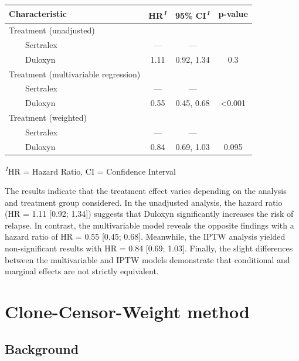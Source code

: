 \documentclass[
]{book}
\begin{document}
\begin{table}[!t]
\fontsize{12.0pt}{14.4pt}\selectfont
\begin{tabular*}{\linewidth}{@{\extracolsep{\fill}}lccc}
\toprule
\textbf{Characteristic} & \textbf{HR}\textsuperscript{\textit{1}} & \textbf{95\% CI}\textsuperscript{\textit{1}} & \textbf{p-value} \\ 
\midrule\addlinespace[2.5pt]
Treatment (unadjusted) &  &  &  \\ 
    Sertralex & — & — &  \\ 
    Duloxyn & 1.11 & 0.92, 1.34 & 0.3 \\ 
Treatment (multivariable regression) &  &  &  \\ 
    Sertralex & — & — &  \\ 
    Duloxyn & 0.55 & 0.45, 0.68 & <0.001 \\ 
Treatment (weighted) &  &  &  \\ 
    Sertralex & — & — &  \\ 
    Duloxyn & 0.84 & 0.69, 1.03 & 0.095 \\ 
\bottomrule
\end{tabular*}
\begin{minipage}{\linewidth}
\textsuperscript{\textit{1}}HR = Hazard Ratio, CI = Confidence Interval\\
\end{minipage}
\end{table}

The results indicate that the treatment effect varies depending on the
analysis and treatment group considered. In the unadjusted analysis, the
hazard ratio (HR = 1.11 {[}0.92; 1.34{]}) suggests that Duloxyn
significantly increases the risk of relapse. In contrast, the
multivariable model reveals the opposite findings with a hazard ratio of
HR = 0.55 {[}0.45; 0.68{]}. Meanwhile, the IPTW analysis yielded
non-significant results with HR = 0.84 {[}0.69; 1.03{]}. Finally, the
slight differences between the multivariable and IPTW models demonstrate
that conditional and marginal effects are not strictly equivalent.

\chapter{Clone-Censor-Weight method}\label{clone-censor-weight}

\section{Background}\label{background-2}
\end{document}
